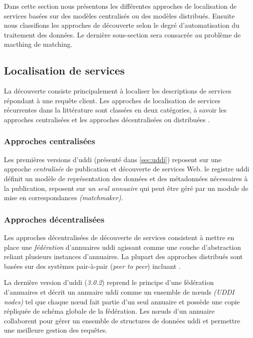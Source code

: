 Dans cette section nous présentons les différentes approches de
localisation de services basées sur des modèles centralisés ou des
modèles distribués. Ensuite nous classifions les approches de
découverte selon le degré d'automatisation du traitement des
données. Le dernière sous-section sera consacrée au problème de
macthing de matching.

\subsection{Localisation de services}
\label{sec:ws-localisation}
  La découverte consiste principalement à localiser les descriptions
  de services répondant à une requête client. Les approches de
  localisation de services récurrentes dans la littérature sont
  classées en deux catégories, à savoir les approches centralisées et
  les approches décentralisées ou distribuées
  \cite{garofalakis2004web}.

    \subsubsection{Approches centralisées}
    Les premières versions d'\acrshort{uddi} \cite{clement2004uddi}
    (présenté dans \ref{sec:uddi}) reposent sur une approche
    \textit{centralisée} de publication et découverte de services
    Web. le registre \acrshort{uddi} définit un modèle de
    représentation des données et des métadonnées nécessaires à la
    publication, reposent sur \textit{un seul annuaire} qui peut être
    géré par un module de mise en correspondances
    \textit{(matchmaker)}.

    \subsubsection{Approches décentralisées}
    Les approches décentralisées de découverte de services
    \cite{rompothong2003query, sivashanmugam2004discovery,
      paolucci2003using, schmidt2004peer, verma2005meteor,
      sahin2005spider} consistent à mettre en place une
    \textit{fédération} d'annuaires \acrshort{uddi} agissant comme une
    couche d'abstraction reliant plusieurs instances d'annuaires. La
    plupart des approches distribués sont basées sur des systèmes
    pair-à-pair (\textit{peer to peer}) incluant
    \cite{schmidt2004peer, verma2005meteor, sahin2005spider}.

    La dernière version d'\acrshort{uddi} \cite{oasis2005specification}
    (\textit{3.0.2}) reprend le principe d'une fédération d'annuaires
    et décrit un annuaire \acrshort{uddi} comme un ensemble de nœuds
    \textit{(UDDI nodes)} tel que chaque nœud fait partie d'un seul
    annuaire et possède une copie répliquée de schéma globale de la
    fédération. Les nœuds d'un annuaire collaborent pour gérer un
    ensemble de structures de données \acrshort{uddi} et permettre une
    meilleure gestion des requêtes.

